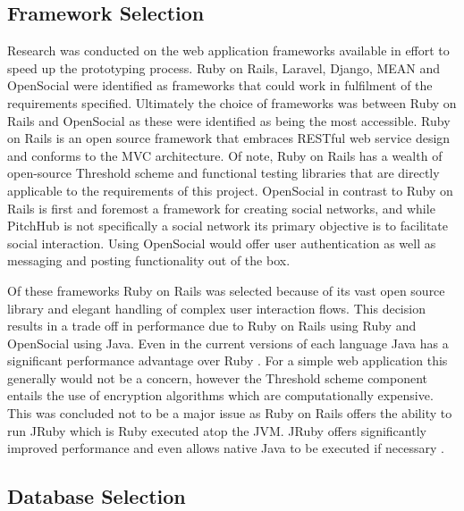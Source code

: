 \subsection{Framework Selection}\label{SS:frameworkSelection}

Research was conducted on the web application frameworks available in effort to speed up the prototyping process. Ruby on Rails, Laravel, Django, MEAN and OpenSocial were identified as frameworks that could work in fulfilment of the requirements specified. Ultimately the choice of frameworks was between Ruby on Rails and OpenSocial as these were identified as being the most accessible. Ruby on Rails is an open source framework that embraces RESTful web service design and conforms to the MVC architecture. Of note, Ruby on Rails has a wealth of open-source Threshold scheme and functional testing libraries that are directly applicable to the requirements of this project. OpenSocial in contrast to Ruby on Rails is first and foremost a framework for creating social networks, and while PitchHub is not specifically a social network its primary objective is to facilitate social interaction. Using OpenSocial would offer user authentication as well as messaging and posting functionality out of the box. 
\par
Of these frameworks Ruby on Rails was selected because of its vast open source library and elegant handling of complex user interaction flows. This decision results in a trade off in performance due to Ruby on Rails using Ruby and OpenSocial using Java. Even in the current versions of each language Java has a significant  performance advantage over Ruby \cite{Perfo1:online}. For a simple web application this generally would not be a concern, however the Threshold scheme component entails the use of encryption algorithms which are computationally expensive. This was concluded not to be a major issue as Ruby on Rails offers the ability to run JRuby which is Ruby executed atop the JVM. JRuby offers significantly improved performance and even allows native Java to be executed if necessary \cite{Jruby:online}.

\subsection{Database Selection}\label{SS:databaseSelection}

